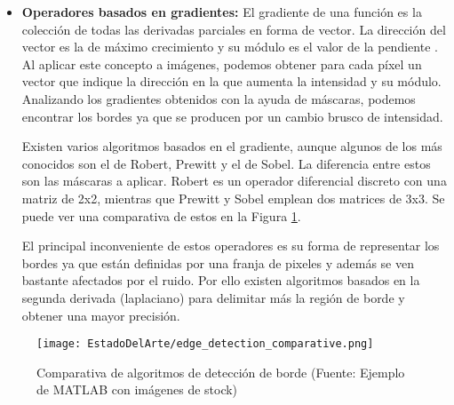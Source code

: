 \begin{itemize}
\item \textbf{Operadores basados en gradientes:} El gradiente de una función es la colección de todas las derivadas parciales en forma de vector. La dirección del vector es la de máximo crecimiento y su módulo es el valor de la pendiente \cite{khan}. Al aplicar este concepto a imágenes, podemos obtener para cada píxel un vector que indique la dirección en la que aumenta la intensidad y su módulo. Analizando los gradientes obtenidos con la ayuda de máscaras, podemos encontrar los bordes ya que se producen por un cambio brusco de intensidad.

Existen varios algoritmos basados en el gradiente, aunque algunos de los más conocidos son el de Robert, Prewitt y el de Sobel. La diferencia entre estos son las máscaras a aplicar. Robert es un operador diferencial discreto con una matriz de 2x2, mientras que Prewitt y Sobel emplean dos matrices de 3x3. Se puede ver una comparativa de estos en la Figura \ref{chap:Estado de la cuestion fig:EDGE}.

El principal inconveniente de estos operadores es su forma de representar los bordes ya que están definidas por una franja de pixeles y además se ven bastante afectados por el ruido. Por ello existen algoritmos basados en la segunda derivada (laplaciano) para delimitar más la región de borde y obtener una mayor precisión.
\end{itemize}

\begin{figure}[ht]
	\centering
	\texttt{[image: EstadoDelArte/edge\_detection\_comparative.png]}
	\caption[Comparativa de algoritmos de detección de borde]{Comparativa de algoritmos de detección de borde (Fuente: Ejemplo 		de MATLAB con imágenes de stock)}
	\label{chap:Estado de la cuestion fig:EDGE}
	\vspace{-5pt}
\end{figure}

